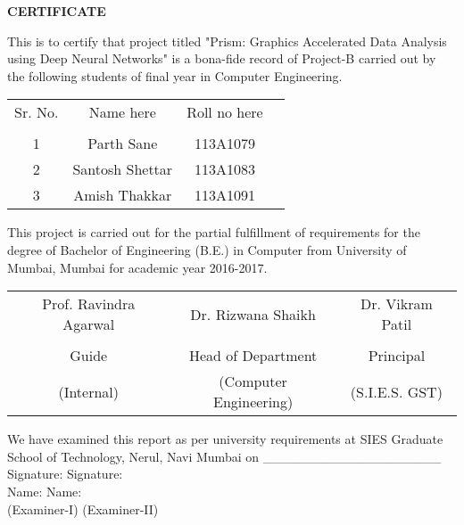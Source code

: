 

\newpage
\thispagestyle{empty}

\begin{center}
\large {\textbf{CERTIFICATE}}\\[0.5cm]
\end{center}

\normalsize This is to certify that project titled "Prism: Graphics Accelerated Data Analysis using Deep Neural Networks" is a bona-fide record of Project-B carried out by the following students of final year in Computer Engineering.\\[1.0cm]

\begin{table}[h]
\centering
\begin{tabular}{c c c c}
Sr. No. & Name here &  Roll no here\\
\\
1 & Parth Sane &  113A1079 \\ 
2 & Santosh Shettar &  113A1083\\
3 & Amish Thakkar &  113A1091 \\
\end{tabular}
\end{table}

\vspace{2cm}

This project is carried out for the partial fulfillment of requirements for the degree of Bachelor of Engineering (B.E.) in Computer from University of Mumbai, Mumbai for academic year 2016-2017.
\vspace{2cm}
\begin{table}[h]
	\centering
	\begin{tabular}{c c c}
		Prof. Ravindra Agarwal & Dr. Rizwana Shaikh &  Dr. Vikram Patil \\
		\\
		Guide & Head of Department & Principal \\ 
		\small (Internal) & \small (Computer Engineering) &  \small (S.I.E.S. GST)\\
		\hline
	\end{tabular}
\end{table}

We have examined this report as per university requirements at SIES Graduate School of Technology, Nerul, Navi Mumbai on 
\_\_\_\_\_\_\_\_\_\_\_\_\_\_\_\_\_\_\_\\


Signature: \hspace{5.7cm} Signature:  \\

Name:\hspace{6.5cm}  Name: \\

(Examiner-I)  \hspace{5cm}  (Examiner-II) \\

